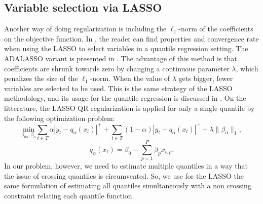 \subsection{Variable selection via LASSO}
\label{sec:best-subset-ell1}

Another way of doing regularization is including the $\ell_1$-norm of the coefficients on the objective function. In \cite{belloni_l1-penalized_2009}, the reader can find properties and convergence rate when using the LASSO to select variables in a quantile regression setting. The ADALASSO variant is presented in \cite{ciuperca_adaptive_2016}. 
The advantage of this method is that coefficients are shrunk towards zero by changing a continuous parameter $\lambda$, which penalizes the size of the $\ell_1$-norm.  
When the value of $\lambda$ gets bigger, fewer variables are selected to be used. 
This is the same strategy of the LASSO methodology, and its usage for the quantile regression is discussed in \cite{li2012l1}.
On the litterature, the LASSO QR regularization is applied for only a single quantile by the following optimization problem:
\begin{equation}
\underset{\beta_{0\alpha},\beta_\alpha}{\text{min}} \sum_{t \in T}\alpha|y_{t}-q_\alpha(x_t)|^{+}+ \sum_{t \in T}(1-\alpha)|y_{t}-q_\alpha(x_t)|^{-}+\lambda\|\beta_\alpha\|_{1},
\label{eq:l1-qar-optim}
\end{equation}
\[
q_\alpha(x_t)=\beta_{0}-\sum_{p=1}^{P}\beta_{p}x_{t,p}.
\]
In our problem, however, we need to estimate multiple quantiles in a way that the issue of crossing quantiles is circumvented. So, we use for the LASSO the same formulation of estimating all quantiles simultaneously with a non crossing constraint relating each quantile function.



